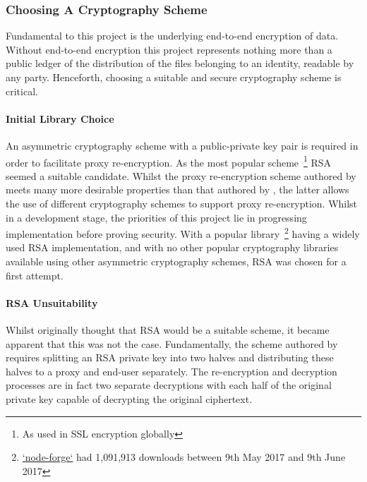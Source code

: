 \subsubsection{Choosing A Cryptography Scheme}

Fundamental to this project is the underlying end-to-end encryption of data. Without end-to-end encryption this project represents nothing more than a public ledger of the distribution of the files belonging to an identity, readable by any party. Henceforth, choosing a suitable and secure cryptography scheme is critical.

\paragraph{Initial Library Choice}

An asymmetric cryptography scheme with a public-private key pair is required in order to facilitate proxy re-encryption. As the most popular scheme~\footnote{As used in SSL encryption globally} RSA~\cite{rsa:1978:article} seemed a suitable candidate. Whilst the proxy re-encryption scheme authored by \cite{afgh:2006:article} meets many more desirable properties than that authored by \cite{ivandodis:2003:inproceedings}, the latter allows the use of different cryptography schemes to support proxy re-encryption. Whilst in a development stage, the priorities of this project lie in progressing implementation before proving security. With a popular library~\footnote{\href{https://www.npmjs.com/package/node-forge}{`node-forge`} had 1,091,913 downloads between 9th May 2017 and 9th June 2017} having a widely used RSA implementation, and with no other popular cryptography libraries available using other asymmetric cryptography schemes, RSA was chosen for a first attempt.

\paragraph{RSA Unsuitability}

Whilst originally thought that RSA would be a suitable scheme, it became apparent that this was not the case. Fundamentally, the scheme authored by \cite{ivandodis:2003:inproceedings} requires splitting an RSA private key into two halves and distributing these halves to a proxy and end-user separately. The re-encryption and decryption processes are in fact two separate decryptions with each half of the original private key capable of decrypting the original ciphertext.

